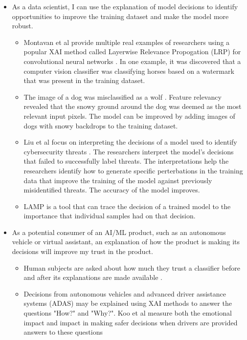 \documentclass{IEEEtran}
\begin{document}
\begin{itemize}
    \item As a data scientist, I can use the explanation of model decisions to identify opportunities to improve the training dataset and make the model more robust. 
    \begin{itemize}
        \item Montavan et al provide multiple real examples of researchers using a popular XAI method called Layerwise Relevance Propogation (LRP) for convolutional neural networks \cite{MONTAVON20181}.  In one example, it was discovered that a computer vision classifier was classifying horses based on a watermark that was present in the training dataset.
        \item The image of a dog was misclassified as a wolf \cite{Ribeiro:2016:WIT:2939672.2939778}.  Feature relevancy revealed that the snowy ground around the dog was deemed as the most relevant input pixels.  The model can be improved by adding images of dogs with snowy backdrops to the training dataset.
        \item Liu et al focus on interpreting the decisions of a model used to identify cybersecurity threats \cite{Liu:2018:ADM:3219819.3220027}.  The researchers interpret the model's decisions that failed to successfully label threats.  The interpretations help the researchers identify how to generate specific perterbations in the training data that improve the training of the model against previously misidentified threats.  The accuracy of the model improves.
        \item LAMP is a tool that can trace the decision of a trained model to the importance that individual samples had on that decision. \cite{Ma2017}
    \end{itemize}

    \item As a potential consumer of an AI/ML product, such as an autonomous vehicle or virtual assistant, an explanation of how the product is making its decisions will improve my trust in the product.
    \begin{itemize}
        \item Human subjects are asked about how much they trust a classifier before and after its explanations are made available \cite{Ribeiro:2016:WIT:2939672.2939778}.  
        \item Decisions from autonomous vehicles and advanced driver assistance systems (ADAS) may be explained using XAI methods to answer the questions "How?" and "Why?".  Koo et al measure both the emotional impact and impact in making safer decisions when drivers are provided answers to these questions \cite{Koo2015}
    \end{itemize}


\end{itemize}
\end{document}
